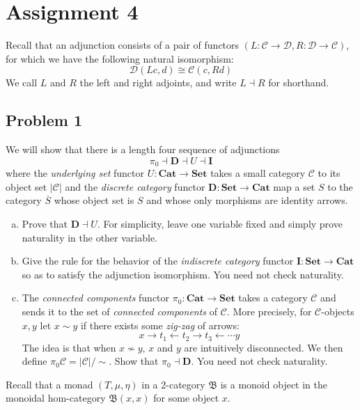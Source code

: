 \documentclass{amsart}
\theoremstyle{remark}
\theoremstyle{definition}
\theoremstyle{definition}
\def\ot{\leftarrow}
\newcommand{\ol}[1]{\overline{#1}}
\def\Set{\mathbf{Set}}
\def\Cat{\mathbf{Cat}}
\def\mcC{\mathcal{C}}
\def\mcD{\mathcal{D}}
\begin{document}
\section{Assignment 4}

Recall that an adjunction consists of a pair of functors $(L:\mcC\to\mcD,R:\mcD\to\mcC)$, for which we have the following natural isomorphism:
\[\mcD(Lc,d)\cong\mcC(c,Rd)\]
We call $L$ and $R$ the left and right adjoints, and write $L\dashv R$ for shorthand.

\subsection{Problem 1}

We will show that there is a length four sequence of adjunctions
\[\pi_0\dashv \mathbf{D}\dashv U\dashv \mathbf{I}\]
where the \emph{underlying set} functor $U:\Cat\to\Set$ takes a small category $\mcC$ to its object set $|\mcC|$ and the \emph{discrete category} functor $\mathbf{D}:\Set\to\Cat$ map a set $S$ to the category $\ol{S}$ whose object set is $S$ and whose only morphisms are identity arrows.

\begin{enumerate}[(a)]
    \item Prove that $\mathbf{D}\dashv U$. For simplicity, leave one variable fixed and simply prove naturality in the other variable.
    
    \item Give the rule for the behavior of the \emph{indiscrete category} functor $\mathbf{I}:\Set\to \Cat$ so as to satisfy the adjunction isomorphism. You need not check naturality.
    
    \item The \emph{connected components} functor $\pi_0:\Cat\to\Set$ takes a category $\mcC$ and sends it to the set of \emph{connected components} of $\mcC$. More precisely, for $\mcC$-objects $x,y$ let $x\sim y$ if there exists some \emph{zig-zag} of arrows:
    \[x\to t_1 \ot t_2 \to t_3 \ot \cdots y\]
    The idea is that when $x\not\sim y$, $x$ and $y$ are intuitively disconnected.
    We then define $\pi_0\mcC=|\mcC|/\sim$. Show that $\pi_0\dashv\mathbf{D}$. You need not check naturality.
      
\end{enumerate}

\vspace{5 mm}

Recall that a monad $(T,\mu,\eta)$ in a 2-category $\mathfrak{B}$ is a monoid object in the monoidal hom-category $\mathfrak{B}(x,x)$ for some object $x$.
\end{document}
